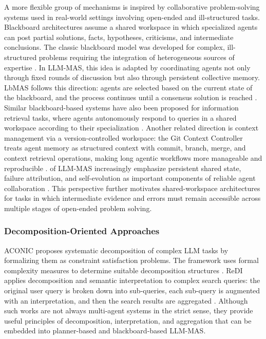 A more flexible group of mechanisms is inspired by collaborative problem-solving systems used in real-world settings involving open-ended and ill-structured tasks.
Blackboard architectures assume a shared workspace in which specialized agents can post partial solutions, facts, hypotheses, criticisms, and intermediate conclusions.
The classic blackboard model was developed for complex, ill-structured problems requiring the integration of heterogeneous sources of expertise \cite{nii1986blackboard}.
In LLM-MAS, this idea is adapted by coordinating agents not only through fixed rounds of discussion but also through persistent collective memory.
LbMAS follows this direction: agents are selected based on the current state of the blackboard, and the process continues until a consensus solution is reached \cite{han2025blackboard}.
Similar blackboard-based systems have also been proposed for information retrieval tasks, where agents autonomously respond to queries in a shared workspace according to their specialization \cite{salemi2025blackboard}.
Another related direction is context management via a version-controlled workspace: the Git Context Controller treats agent memory as structured context with commit, branch, merge, and context retrieval operations, making long agentic workflows more manageable and reproducible \cite{wu2025gitcontext}.
 of LLM-MAS increasingly emphasize persistent shared state, failure attribution, and self-evolution as important components of reliable agent collaboration \cite{qi2026beyond}.
This perspective further motivates shared-workspace architectures for tasks in which intermediate evidence and errors must remain accessible across multiple stages of open-ended problem solving.

\subsubsection{Decomposition-Oriented Approaches}

ACONIC proposes systematic decomposition of complex LLM tasks by formalizing them as constraint satisfaction problems.
The framework uses formal complexity measures to determine suitable decomposition structures \cite{zhou2025aconic}.
ReDI applies decomposition and semantic interpretation to complex search queries: the original user query is broken down into sub-queries, each sub-query is augmented with an interpretation, and then the search results are aggregated \cite{zhong2025redi}.
Although such works are not always multi-agent systems in the strict sense, they provide useful principles of decomposition, interpretation, and aggregation that can be embedded into planner-based and blackboard-based LLM-MAS.

